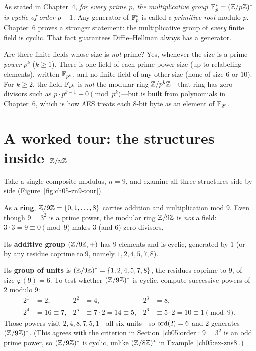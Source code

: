 \begin{formalbox}
As stated in Chapter~4, \emph{for every prime $p$, the multiplicative group $\mathbb{F}_p^{*} = (\mathbb{Z}/p\mathbb{Z})^{*}$ is cyclic of order
$p-1$.} Any generator of $\mathbb{F}_p^{*}$ is called a \emph{primitive root} modulo $p$. Chapter~6 proves a stronger statement: the multiplicative group of \emph{every} finite field is cyclic. That fact guarantees Diffie--Hellman always has a generator.
\end{formalbox}

\begin{focusbox}
Are there finite fields whose size is \emph{not} prime? Yes, whenever the size is a
prime \emph{power} $p^k$ ($k \ge 1$). There is one field of each prime-power size (up to relabeling elements), written
$\mathbb{F}_{p^k}$, and no finite field of any other size (none of size $6$ or $10$). For $k \ge 2$, the field $\mathbb{F}_{p^k}$ is \emph{not} the modular ring $\mathbb{Z}/p^k\mathbb{Z}$---that ring has zero divisors such as $p \cdot p^{k-1} \equiv 0 \pmod{p^k}$---but is built from polynomials in Chapter~6, which is how AES treats each $8$-bit byte as an element of $\mathbb{F}_{2^8}$.
\end{focusbox}

\section{A worked tour: the structures inside $\mathbb{Z}/n\mathbb{Z}$}
\label{ch05:tour}

Take a single composite modulus, $n=9$, and examine all three structures side by side (Figure~\ref{fig:ch05-zn9-tour}).

As a \textbf{ring}, $\mathbb{Z}/9\mathbb{Z} = \{0,1,\dots,8\}$ carries addition and multiplication mod $9$.
Even though $9 = 3^2$ is a prime power, the modular ring $\mathbb{Z}/9\mathbb{Z}$ is \emph{not} a field: $3\cdot 3 = 9 \equiv
0 \pmod{9}$ makes $3$ (and $6$) zero divisors.

Its \textbf{additive group} $(\mathbb{Z}/9\mathbb{Z},+)$ has $9$ elements and is cyclic, generated by $1$
(or by any residue coprime to $9$, namely $1,2,4,5,7,8$).

Its \textbf{group of units} is $(\mathbb{Z}/9\mathbb{Z})^{*} = \{1,2,4,5,7,8\}$, the residues coprime to $9$, of size
$\varphi(9)=6$. To test whether $(\mathbb{Z}/9\mathbb{Z})^{*}$ is cyclic, compute successive powers of $2$ modulo $9$:
\[
\begin{aligned}
  2^1 &= 2, & 2^2 &= 4, & 2^3 &= 8, \\
  2^4 &= 16 \equiv 7, & 2^5 &\equiv 7 \cdot 2 = 14 \equiv 5, & 2^6 &\equiv 5 \cdot 2 = 10 \equiv 1 \pmod{9}.
\end{aligned}
\]
Those powers visit $2,4,8,7,5,1$---all six units---so $\operatorname{ord}(2)=6$ and $2$ generates $(\mathbb{Z}/9\mathbb{Z})^{*}$.
(This agrees with the criterion in Section~\ref{ch05:order}: $9 = 3^2$ is an odd prime power,
so $(\mathbb{Z}/9\mathbb{Z})^{*}$ is cyclic, unlike $(\mathbb{Z}/8\mathbb{Z})^{*}$ in Example~\ref{ch05:ex-zns8}.)

